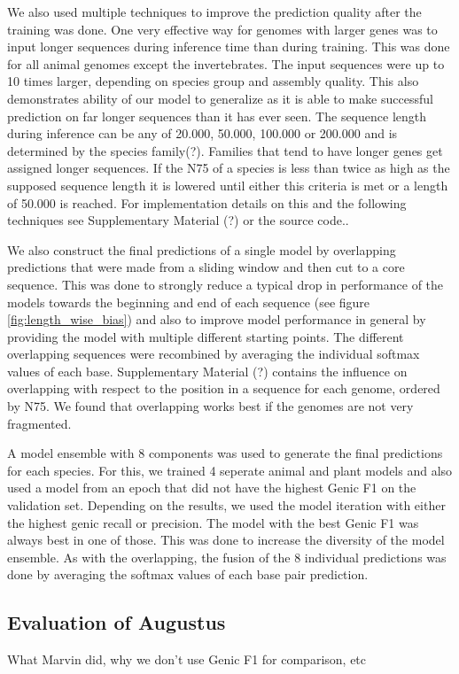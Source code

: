 \documentclass{bioinfo}
\begin{document}
\begin{methods}
We also used multiple techniques to improve the prediction quality after the training was done. One very effective way for genomes with larger genes was to input longer sequences during inference time than during training. This was done for all animal genomes except the invertebrates. The input sequences were up to 10 times larger, depending on species group and assembly quality. This also demonstrates ability of our model to generalize as it is able to make successful prediction on far longer sequences than it has ever seen. The sequence length during inference can be any of 20.000, 50.000, 100.000 or 200.000 and is determined by the species family(?). Families that tend to have longer genes get assigned longer sequences. If the N75 of a species is less than twice as high as the supposed sequence length it is lowered until either this criteria is met or a length of 50.000 is reached. For implementation details on this and the following techniques see Supplementary Material (?) or the source code.. 
	
We also construct the final predictions of a single model by overlapping predictions that were made from a sliding window and then cut to a core sequence. This was done to strongly reduce a typical drop in performance of the models towards the beginning and end of each sequence (see figure \ref{fig:length_wise_bias}) and also to improve model performance in general by providing the model with multiple different starting points. The different overlapping sequences were recombined by averaging the individual softmax values of each base. Supplementary Material (?) contains the influence on overlapping with respect to the position in a sequence for each genome, ordered by N75. We found that overlapping works best if the genomes are not very fragmented.

A model ensemble with 8 components was used to generate the final predictions for each species. For this, we trained 4 seperate animal and plant models and also used a model from an epoch that did not have the highest Genic F1 on the validation set. Depending on the results, we used the model iteration with either the highest genic recall or precision. The model with the best Genic F1 was always best in one of those. This was done to increase the diversity of the model ensemble. As with the overlapping, the fusion of the 8 individual predictions was done by averaging the softmax values of each base pair prediction.

\subsection{Evaluation of Augustus} \label{augustus}
What Marvin did, why we don't use Genic F1 for comparison, etc



\end{methods}
\end{document}
